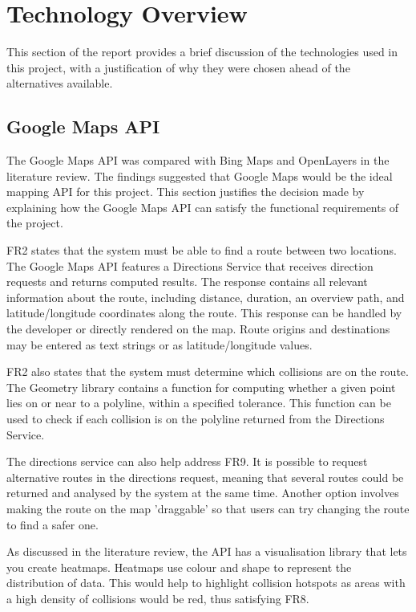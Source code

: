\documentclass[authoryearcitations]{UoYCSproject}
\begin{document}
\section{Technology Overview}

This section of the report provides a brief discussion of the technologies used in this project, with a justification of why they were chosen ahead of the alternatives available.

\subsection{Google Maps API}

The Google Maps API \citep{Google} was compared with Bing Maps and OpenLayers in the literature review. The findings suggested that Google Maps would be the ideal mapping API for this project. This section justifies the decision made by explaining how the Google Maps API can satisfy the functional requirements of the project.

FR2 states that the system must be able to find a route between two locations. The Google Maps API features a Directions Service that receives direction requests and returns computed results. The response contains all relevant information about the route, including distance, duration, an overview path, and latitude/longitude coordinates along the route. This response can be handled by the developer or directly rendered on the map. Route origins and destinations may be entered as text strings or as latitude/longitude values. 

FR2 also states that the system must determine which collisions are on the route. The Geometry library contains a function for computing whether a given point lies on or near to a polyline, within a specified tolerance. This function can be used to check if each collision is on the polyline returned from the Directions Service.

The directions service can also help address FR9. It is possible to request alternative routes in the directions request, meaning that several routes could be returned and analysed by the system at the same time. Another option involves making the route on the map 'draggable' so that users can try changing the route to find a safer one.

As discussed in the literature review, the API has a visualisation library that lets you create heatmaps. Heatmaps use colour and shape to represent the distribution of data. This would help to highlight collision hotspots as areas with a high density of collisions would be red, thus satisfying FR8. 
\end{document}
